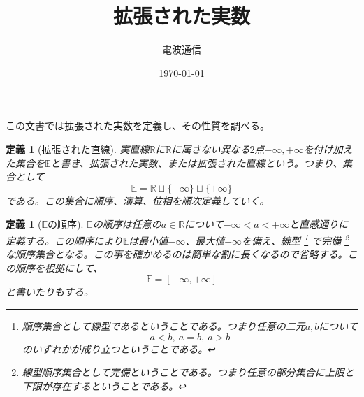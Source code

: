 \documentclass[leqno]{jsarticle}
\title{拡張された実数}
\author{電波通信}
\date{\today}
\newtheorem{df}[thm]{定義}
\newcommand{\rr}{\mathbb{R}}
\newcommand{\mgn}{\infty}
\newcommand{\rrr}{\mathbb{E}}
\begin{document}
\maketitle

この文書では拡張された実数を定義し、その性質を調べる。
\begin{df}[拡張された直線]%
実直線$\rr$に$\rr$に属さない異なる$2$点$-\mgn,+\mgn$を付け加えた集合を$\rrr$と書き、拡張された実数、または拡張された直線という。つまり、集合として
\[
\rrr=\rr\sqcup\{-\mgn\}\sqcup\{+\mgn\}
\]
である。この集合に順序、演算、位相を順次定義していく。
\end{df}


\begin{df}[$\rrr$の順序]
$\rrr$の順序は任意の$a\in \rr$について$-\mgn<a<+\mgn$と直感通りに定義する。この順序により$\rrr$は最小値$-\mgn$、最大値$+\mgn$を備え、線型
	\footnote{順序集合として線型であるということである。つまり任意の二元$a,b$について
\[
a<b,\ a=b,\ a>b
\]のいずれかが成り立つということである。}
で完備
	\footnote{線型順序集合として完備ということである。つまり任意の部分集合に上限と下限が存在するということである。}
な順序集合となる。この事を確かめるのは簡単な割に長くなるので省略する。この順序を根拠にして、
\[
\rrr=[-\mgn,+\mgn]
\]
と書いたりもする。
\end{df}
\end{document}
